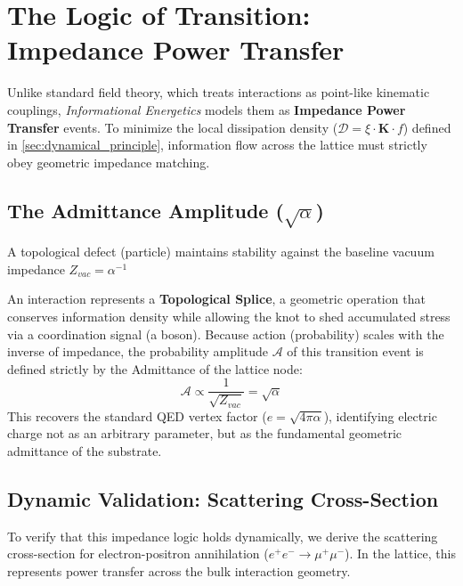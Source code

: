 \section{The Logic of Transition: Impedance Power Transfer}
\label{sec:impedancepowertransfer}

Unlike standard field theory, which treats interactions as point-like kinematic couplings, \textit{Informational Energetics} models them as \textbf{Impedance Power Transfer} events. To minimize the local dissipation density ($\mathcal{D} = \xi \cdot \mathbf{K} \cdot f$) defined in \cref{sec:dynamical_principle}, information flow across the lattice must strictly obey geometric impedance matching.

\subsection{The Admittance Amplitude (\texorpdfstring{$\sqrt{\alpha}$}{sqrtalpha})}
A topological defect (particle) maintains stability against the baseline vacuum impedance $Z_{vac} = \alpha^{-1}$

An interaction represents a \textbf{Topological Splice}, a geometric operation that conserves information density while allowing the knot to shed accumulated stress via a coordination signal (a boson). Because action (probability) scales with the inverse of impedance, the probability amplitude $\mathcal{A}$ of this transition event is defined strictly by the Admittance of the lattice node:
\begin{equation}
\mathcal{A} \propto \frac{1}{\sqrt{Z_{vac}}} = \sqrt{\alpha}
\end{equation}
This recovers the standard QED vertex factor ($e = \sqrt{4\pi\alpha}$), identifying electric charge not as an arbitrary parameter, but as the fundamental geometric admittance of the substrate.

\subsection{Dynamic Validation: Scattering Cross-Section}
To verify that this impedance logic holds dynamically, we derive the scattering cross-section for electron-positron annihilation ($e^+e^- \to \mu^+\mu^-$). In the lattice, this represents power transfer across the bulk interaction geometry.

